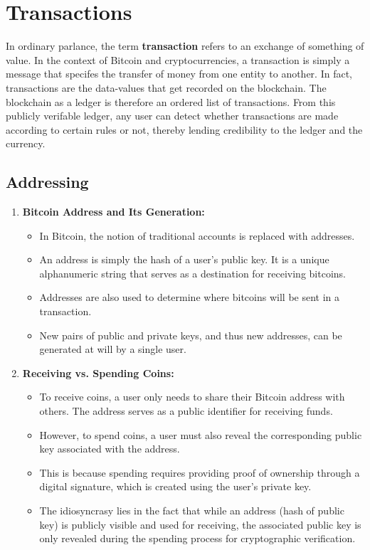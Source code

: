 \section{Transactions}
In ordinary parlance, the term \textbf{transaction} refers to an exchange of something of value. In the context of Bitcoin and cryptocurrencies, a transaction is simply a message that specifes the transfer of money from one entity to another. In fact, transactions are the data-values that get recorded on the blockchain. The blockchain as a ledger is therefore an ordered list of transactions. From this publicly verifable ledger, any user can detect whether transactions are made according to certain rules or not, thereby lending credibility to the ledger and the currency.
\subsection{Addressing}
\begin{enumerate}
	\item \textbf{Bitcoin Address and Its Generation:}
	\begin{itemize}
		\item In Bitcoin, the notion of traditional accounts is replaced with addresses.
		\item An address is simply the hash of a user's public key. It is a unique alphanumeric string that serves as a destination for receiving bitcoins.
		\item Addresses are also used to determine where bitcoins will be sent in a transaction.
		\item New pairs of public and private keys, and thus new addresses, can be generated at will by a single user.
	\end{itemize}
	\item \textbf{Receiving vs. Spending Coins:}
	\begin{itemize}
		\item To receive coins, a user only needs to share their Bitcoin address with others. The address serves as a public identifier for receiving funds.
		\item However, to spend coins, a user must also reveal the corresponding public key associated with the address.
		\item This is because spending requires providing proof of ownership through a digital signature, which is created using the user's private key.
		\item The idiosyncrasy lies in the fact that while an address (hash of public key) is publicly visible and used for receiving, the associated public key is only revealed during the spending process for cryptographic verification.
	\end{itemize}
\end{enumerate}
